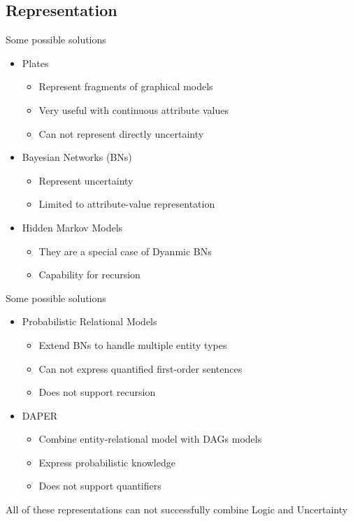 \subsection{Representation}

\begin{frame}
	\pause
	\begin{block}{Some possible solutions}
		\begin{itemize}
			\item Plates
			\begin{itemize}
				\item Represent fragments of graphical models
				\item Very useful with continuous attribute values
				\item Can not represent directly uncertainty
			\end{itemize}
			\pause
			\item Bayesian Networks (BNs)
			\begin{itemize}
				\item Represent uncertainty
				\item Limited to attribute-value representation
			\end{itemize}
			\pause
			\item Hidden Markov Models
			\begin{itemize}
				\item They are a special case of Dyanmic BNs
				\item Capability for recursion
			\end{itemize}
		\end{itemize}
	\end{block}
\end{frame}

\begin{frame}
	\begin{block}{Some possible solutions}
		\begin{itemize}
			\item Probabilistic Relational Models
			\begin{itemize}
				\item Extend BNs to handle multiple entity types
				\item Can not express quantified first-order sentences
				\item Does not support recursion
			\end{itemize}
			\pause
			\item DAPER
			\begin{itemize}
				\item Combine entity-relational model with DAGs models
				\item Express probabilistic knowledge
				\item Does not support quantifiers
			\end{itemize}
		\end{itemize}
	\end{block}
	All of these representations can not successfully combine \alert{Logic} and \alert{Uncertainty}
\end{frame}